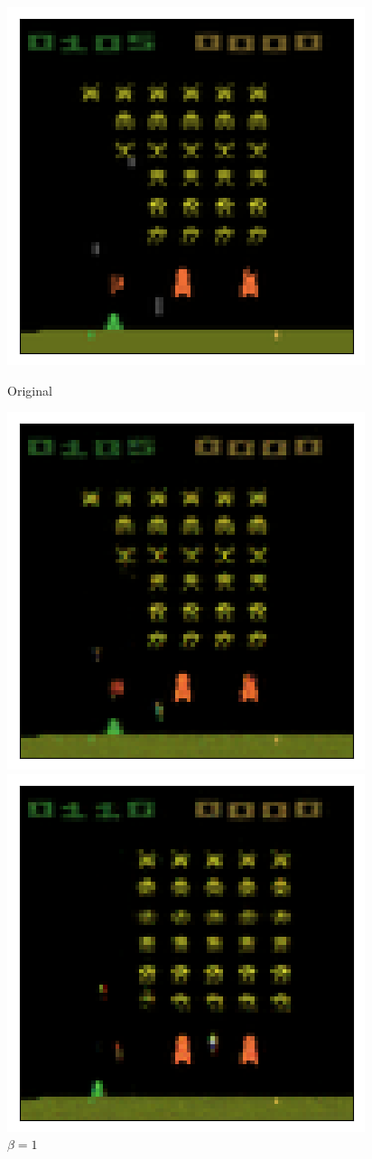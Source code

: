 \begin{figure}[h!]
\begin{multicols}{4}
    \includegraphics[scale=0.4]{figures/results/colour_separated/beta_1_sample_2_original.png}
    \caption{Original}
    \includegraphics[scale=0.4]{figures/results/colour_separated/beta_1_sample_2_reconstructed.png}
    \caption{$\beta = 1$}    
    \includegraphics[scale=0.4]{figures/results/colour_separated/beta_2_sample_2_reconstructed.png}

\end{multicols}
\end{figure}
